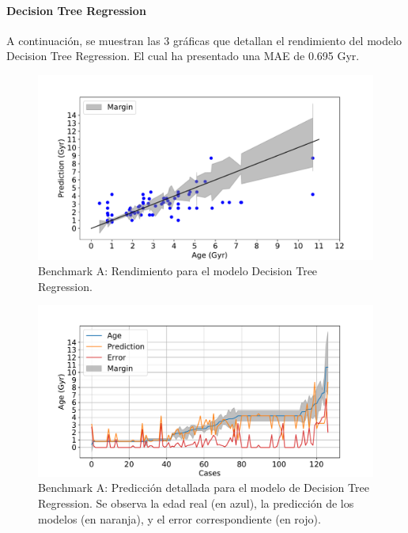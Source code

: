 \paragraph{Decision Tree Regression} 
A continuación, se muestran las 3 gráficas que detallan el rendimiento del modelo Decision Tree Regression. El cual ha presentado una MAE de 0.695 Gyr.

\begin{figure}[H]
\begin{center}
 \includegraphics[width=0.8\linewidth]{Figuras/Experimentos/B_A_dtr_1.pdf}
\end{center}
\caption{Benchmark A: Rendimiento para el modelo Decision Tree Regression.}
 \label{fig:benchA_details_dtr_1}
\end{figure}

\begin{figure}[H]
\begin{center}
 \includegraphics[width=0.8\linewidth]{Figuras/Experimentos/B_A_dtr_2.pdf}
\end{center}
\caption{Benchmark A: Predicción detallada para el modelo de Decision Tree Regression. Se observa la edad real (en azul), la predicción de los modelos (en naranja), y el error correspondiente (en rojo).}
 \label{fig:benchA_details_dtr_2}
\end{figure}

